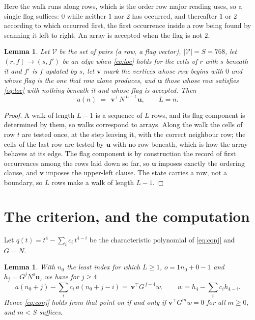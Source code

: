 \documentclass[11pt,a4paper]{article}
\theoremstyle{plain}
\newtheorem{lemma}[theorem]{Lemma}
\theoremstyle{definition}
\begin{document}
Here the walk runs along rows, which is the order row
major reading uses, so a single flag suffices: $0$ while neither $1$ nor $2$ has
occurred, and thereafter $1$ or $2$ according to which occurred first, the first occurrence
inside a row being found by scanning it left to right. An array is accepted when the flag
is not $2$.

\begin{lemma}\label{lem:walk}
Let $\mathcal V$ be the set of pairs (a row, a flag vector), $|\mathcal V|=S=768$, let
$(r,f)\to(s,f')$ be an edge when \eqref{eq:loc} holds for the cells of $r$ with $s$ beneath
it and $f'$ is $f$ updated by $s$, let $\mathbf{v}$ mark the vertices whose row begins
with $0$ and whose flag is the one that row alone produces, and $\mathbf{u}$ those whose
row satisfies \eqref{eq:loc} with nothing beneath it and whose flag is accepted. Then
\[
a(n)\;=\;\,\mathbf{v}^{\!\top}N^{\,L-1}\mathbf{u},\qquad L=n.
\]
\end{lemma}

\begin{proof}
A walk of length $L-1$ is a sequence of $L$ rows, and its flag component is determined by
them, so walks correspond to arrays. Along the walk the cells of row $t$ are tested once,
at the step leaving it, with the correct neighbour row; the cells of the last row are
tested by $\mathbf{u}$ with no row beneath, which is how the array behaves at its edge.
The flag component is by construction the record of first occurrences among the rows laid
down so far, so $\mathbf{u}$ imposes exactly the ordering clause, and $\mathbf{v}$ imposes
the upper-left clause. The state carries a row, not a boundary, so $L$ rows make a walk
of length $L-1$.
\end{proof}

\section{The criterion, and the computation}

Let $q(t)=t^{4}-\sum_i c_i\,t^{4-i}$ be the characteristic polynomial of
\eqref{eq:conj} and $G=N$.

\begin{lemma}\label{lem:crit}
With $n_0$ the least index for which $L\ge1$, $o=1n_0+0-1$ and
$h_j=G^{j}N^{o}\mathbf{u}$, we have for $j\ge4$
\[
a(n_0+j)-\sum_i c_i\,a(n_0+j-i)=\,\mathbf{v}^{\!\top}G^{\,j-4}w,
\qquad w=h_{4}-\sum_i c_ih_{4-i} .
\]
Hence \eqref{eq:conj} holds from that point on if and only if
$\mathbf{v}^{\!\top}G^{m}w=0$ for all $m\ge0$, and $m<S$ suffices.
\end{lemma}
\end{document}
